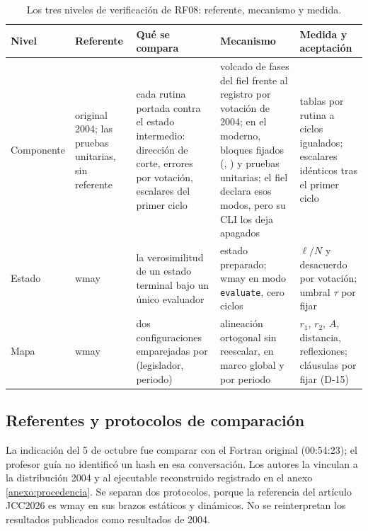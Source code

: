 \begin{table}[tbp]
\centering
\caption{Los tres niveles de verificación de RF08: referente, mecanismo y medida.}
\label{tab:niveles}
\footnotesize
\begin{tabular}{L{2.0cm}L{1.7cm}L{2.8cm}L{3.2cm}L{2.3cm}}
\toprule
Nivel & Referente & Qué se compara & Mecanismo & Medida y aceptación \\
\midrule
Componente & original 2004; las pruebas unitarias, sin referente & cada rutina portada contra
el estado intermedio: dirección de corte, errores por votación, escalares del primer ciclo &
volcado de fases del fiel frente al registro por votación de 2004; en el moderno, bloques
fijados (, ) y pruebas unitarias; el fiel declara
esos modos, pero su CLI los deja apagados & tablas por rutina a ciclos igualados; escalares
idénticos tras el primer ciclo \\
\addlinespace
Estado & wmay & la verosimilitud de un estado terminal bajo un único evaluador & estado
preparado; wmay en modo \texttt{evaluate}, cero ciclos & $\ell/N$ y desacuerdo por votación;
umbral $\tau$ por fijar \\
\addlinespace
Mapa & wmay & dos configuraciones emparejadas por (legislador, periodo) & alineación ortogonal
sin reescalar, en marco global y por periodo & $r_1$, $r_2$, $A$, distancia, reflexiones;
cláusulas por fijar (D-15) \\
\bottomrule
\end{tabular}
\end{table}

\subsection{Referentes y protocolos de comparación}
\label{sec:protocolos}

La indicación del 5 de octubre fue comparar con el Fortran original (00:54:23); el profesor
guía no identificó un hash en esa conversación. Los autores la vinculan a la distribución
2004 y al ejecutable reconstruido registrado en el anexo \ref{anexo:procedencia}. Se separan
dos protocolos, porque la referencia del artículo JCC2026 es wmay en sus brazos estáticos y
dinámicos. No se reinterpretan los resultados publicados como resultados de 2004.

